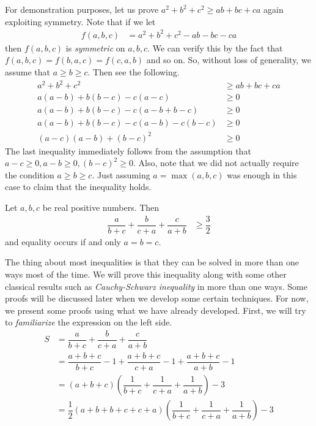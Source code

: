 \documentclass{subfile}
\begin{document}
	For demonstration purposes, let us prove $a^2+b^2+c^2\geq ab+bc+ca$ again exploiting symmetry. Note that if we let
		\begin{align*}
			f(a,b,c)
				& = a^2+b^2+c^2-ab-bc-ca
		\end{align*}
	then $f(a,b,c)$ is \emph{symmetric} on $a,b,c$. We can verify this by the fact that $f(a,b,c)=f(b,a,c)=f(c,a,b)$ and so on. So, without loss of generality, we assume that $a\geq b\geq c$. Then see the following.
		\begin{align*}
			a^2+b^2+c^2
				& \geq ab+bc+ca\\
			a(a-b)+b(b-c)-c(a-c)
				& \geq0\\
			a(a-b)+b(b-c)-c(a-b+b-c)
				& \geq0\\
			a(a-b)+b(b-c)-c(a-b)-c(b-c)
				& \geq0\\
			(a-c)(a-b)+(b-c)^2
				& \geq0
		\end{align*}
	The last inequality immediately follows from the assumption that $a-c\geq0,a-b\geq0,(b-c)^2\geq0$. Also, note that we did not actually require the condition $a\geq b\geq c$. Just assuming $a=\max(a,b,c)$ was enough in this case to claim that the inequality holds. 
		\begin{theorem}\label{thm:nesbitt}
			Let $a,b,c$ be real positive numbers. Then
				\begin{align*}
					\dfrac{a}{b+c}+\dfrac{b}{c+a}+\dfrac{c}{a+b}
						& \geq\dfrac{3}{2}
				\end{align*}
			and equality occurs if and only $a=b=c$.
		\end{theorem}
	The thing about most inequalities is that they can be solved in more than one ways most of the time. We will  prove this inequality along with some other classical results such as \emph{Cauchy-Schwarz inequality} in more than one ways. Some proofs will be discussed later when we develop some certain techniques. For now, we present some proofs using what we have already developed.
	First, we will try to \emph{familiarize} the expression on the left side.
		\begin{align}
			S
				& = \dfrac{a}{b+c}+\dfrac{b}{c+a}+\dfrac{c}{a+b}\nonumber\\
				& = \dfrac{a+b+c}{b+c}-1+\dfrac{a+b+c}{c+a}-1+\dfrac{a+b+c}{a+b}-1\nonumber\\
				& = (a+b+c)\left(\dfrac{1}{b+c}+\dfrac{1}{c+a}+\dfrac{1}{a+b}\right)-3\nonumber\\
				& = \dfrac{1}{2}(a+b+b+c+c+a)\left(\dfrac{1}{b+c}+\dfrac{1}{c+a}+\dfrac{1}{a+b}\right)-3\label{eqn:nesbittf}
		\end{align}
	
\end{document}
